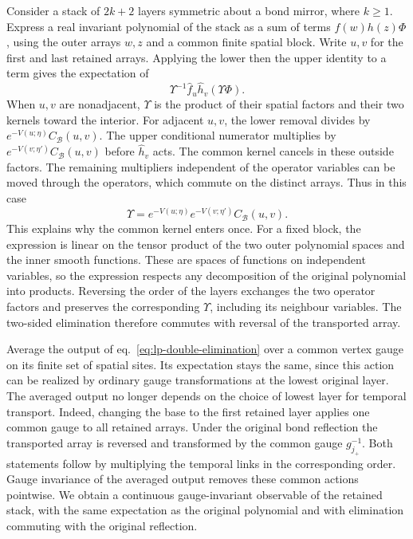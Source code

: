 \documentclass[11pt,letterpaper,reqno]{amsart}
\numberwithin{equation}{section}
\renewcommand{\eqref}[1]{\textup{eq.~\ref{#1}}}
\theoremstyle{definition}
\theoremstyle{remark}
\begin{document}
Consider a stack of \(2k+2\) layers symmetric about a bond mirror,
where \(k\ge1\). Express a real invariant polynomial of the
stack as a sum of terms \(f(w)h(z)\Phi\), using the outer arrays
\(w,z\) and a common finite spatial block. Write \(u,v\) for
the first and last retained arrays. Applying the lower then
the upper identity to a term gives the expectation of
\begin{equation}\label{eq:lp-double-elimination}
                 \Upsilon^{-1}\widehat f_u\widehat h_v
                                      (\Upsilon\Phi).
\end{equation}
When \(u,v\) are nonadjacent, \(\Upsilon\) is the product of
their spatial factors and their two kernels toward the interior.
For adjacent \(u,v\), the lower removal divides by
\(e^{-V(u;\eta)}C_{\mathcal B}(u,v)\). The upper conditional
numerator multiplies by \(e^{-V(v;\eta')}C_{\mathcal B}(u,v)\)
before \(\widehat h_v\) acts. The common kernel cancels in
these outside factors. The remaining multipliers independent
of the operator variables can be moved through the operators,
which commute on the distinct arrays. Thus in this case
\[
             \Upsilon=e^{-V(u;\eta)}e^{-V(v;\eta')}
                                   C_{\mathcal B}(u,v).
\]
This explains why the common kernel enters once. For a fixed block,
the expression is linear on the tensor product of the two outer
polynomial spaces and the inner smooth functions. These are spaces
of functions on independent variables, so the expression respects
any decomposition of the original polynomial into products.
Reversing
the order of the layers exchanges the two operator factors
and preserves the corresponding \(\Upsilon\), including its
neighbour variables. The two-sided elimination therefore
commutes with reversal of the transported array.

Average the output of \eqref{eq:lp-double-elimination} over a
common vertex gauge on its finite set of spatial sites. Its
expectation stays the same, since this action can be realized
by ordinary gauge transformations at the lowest original
layer. The averaged output no longer depends on the choice
of lowest layer for temporal transport. Indeed, changing
the base to the first retained layer applies one common
gauge to all retained arrays. Under the original bond
reflection the transported array is reversed and transformed
by the common gauge \(g_{j_+}^{-1}\). Both statements follow
by multiplying the temporal links in the corresponding
order. Gauge invariance of the averaged output removes
these common actions pointwise. We obtain a continuous
gauge-invariant observable of the retained stack, with
the same expectation as the original polynomial and with
elimination commuting with the original reflection.
\end{document}

